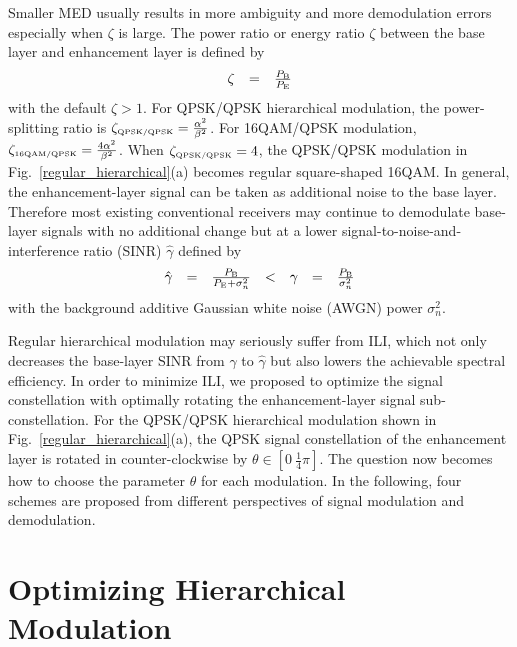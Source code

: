 \documentclass[conference]{IEEEtran}
\begin{document}
\noindent Smaller MED usually results in more ambiguity and more
demodulation errors especially when $\zeta$ is large. The power
ratio or energy ratio $\zeta$ between the base layer and
enhancement layer is defined by
\begin{equation}
\begin{array}{rcl}
\zeta & = & \frac{P_{\mbox{\tiny B}}}{P_{\mbox{\tiny E}}}
\end{array}\label{power_ratio}
\end{equation}
\noindent with the default $\zeta > 1$. For QPSK/QPSK hierarchical
modulation, the power-splitting ratio is $\zeta_{\mbox{\tiny
QPSK/QPSK}}= \frac{\alpha^{2}}{\beta^{2}}$. For 16QAM/QPSK
modulation, $\zeta_{\mbox{\tiny 16QAM/QPSK}}=
\frac{4\alpha^{2}}{\beta^{2}}$. When $\zeta_{\mbox{\tiny
QPSK/QPSK}}=4$, the QPSK/QPSK modulation in
Fig.~\ref{regular_hierarchical}(a) becomes regular square-shaped
16QAM. In general, the enhancement-layer signal can be taken as
additional noise to the base layer. Therefore most existing
conventional receivers may continue to demodulate base-layer
signals with no additional change but at a lower
signal-to-noise-and-interference ratio (SINR) $\hat{\gamma}$
defined by
\begin{equation}
\begin{array}{rcccccl}
\hat{\gamma}& = & \frac{P_{\mbox{\tiny B}}}{P_{\mbox{\tiny
E}}+\sigma_{n}^{2}}&<&\gamma&=&\frac{P_{\mbox{\tiny
B}}}{\sigma_{n}^{2}}
\end{array}\label{SINR}
\end{equation}
\noindent with the background additive Gaussian white noise (AWGN)
power $\sigma_{n}^{2}$.

Regular hierarchical modulation may seriously suffer from ILI,
which not only decreases the base-layer SINR from ${\gamma}$ to
$\hat{\gamma}$ but also lowers the achievable spectral efficiency.
In order to minimize ILI, we proposed to optimize the signal
constellation with optimally rotating the enhancement-layer signal
sub-constellation. For the QPSK/QPSK hierarchical modulation shown
in Fig.~\ref{regular_hierarchical}(a), the QPSK signal
constellation of the enhancement layer is rotated in
counter-clockwise by $\theta\in\left[0\ \frac{1}{4}\pi\right]$.
The question now becomes how to choose the parameter $\theta$ for
each modulation. In the following, four schemes are proposed from
different perspectives of signal modulation and demodulation.

\section{Optimizing Hierarchical Modulation}
\end{document}
